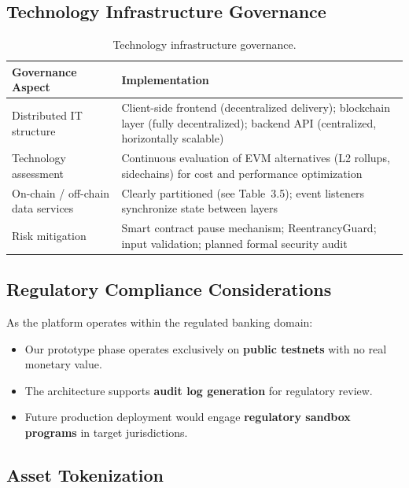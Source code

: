 \documentclass[12pt,a4paper]{report}
\newcommand{\tableheadfont}{\bfseries\small\color{PrimaryBlue}}
\newenvironment{moderntable}[1][H]{%
    \begin{table}[#1]\centering\small%
    \renewcommand{\arraystretch}{1.35}%
}{%
    \end{table}%
}
\begin{document}
\subsection{Technology Infrastructure Governance}

\begin{moderntable}
\caption{Technology infrastructure governance.}
\begin{tabular}{@{} >{\raggedright}p{3.5cm} >{\raggedright\arraybackslash}p{8.5cm} @{}}
\toprule
\tableheadfont Governance Aspect & \tableheadfont Implementation \\
\midrule
\rowcolor{RowShade}
Distributed IT structure & Client-side frontend (decentralized delivery); blockchain layer (fully decentralized); backend API (centralized, horizontally scalable) \\
Technology assessment & Continuous evaluation of EVM alternatives (L2 rollups, sidechains) for cost and performance optimization \\
\rowcolor{RowShade}
On-chain / off-chain data services & Clearly partitioned (see Table~3.5); event listeners synchronize state between layers \\
Risk mitigation & Smart contract pause mechanism; ReentrancyGuard; input validation; planned formal security audit \\
\bottomrule
\end{tabular}
\end{moderntable}

\subsection{Regulatory Compliance Considerations}

As the platform operates within the regulated banking domain:
\begin{itemize}[noitemsep]
\item Our prototype phase operates exclusively on \textbf{public testnets} with no real monetary value.
\item The architecture supports \textbf{audit log generation} for regulatory review.
\item Future production deployment would engage \textbf{regulatory sandbox programs} in target jurisdictions.
\end{itemize}

\subsection{Asset Tokenization}
\end{document}
